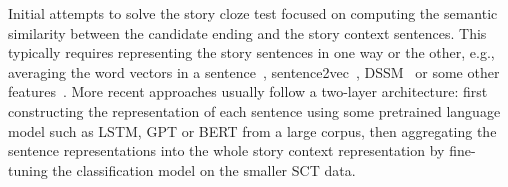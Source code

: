 
Initial attempts to solve the story cloze test focused on computing the semantic 
similarity between the candidate ending and the story context sentences. This typically
requires representing the story sentences in one way or the other, e.g., averaging
the word vectors in a sentence~\cite{mikolov2013distributed}, sentence2vec~\cite{kiros2015skip}, DSSM~\cite{huang2013learning} or some other features~\cite{schwartz2017story}.
More recent approaches usually follow a two-layer architecture: first constructing
the representation of each sentence using some pretrained language model such as
LSTM, GPT or BERT  from a large corpus, then aggregating the sentence representations
into the whole story context representation by 
fine-tuning the classification model on the smaller SCT data.

